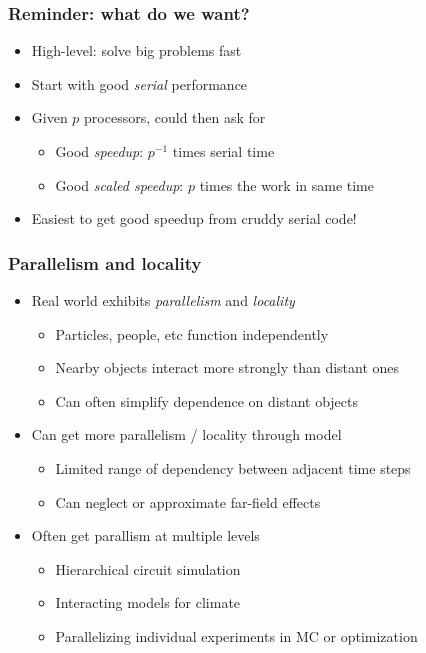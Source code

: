 \documentclass{beamer}
\begin{document}
\begin{frame}
  \frametitle{Reminder: what do we want?}

  \begin{itemize}
  \item High-level: solve big problems fast
  \item Start with good {\em serial} performance
  \item Given $p$ processors, could then ask for
    \begin{itemize}
    \item Good {\em speedup}: $p^{-1}$ times serial time
    \item Good {\em scaled speedup}: $p$ times the work in same time
    \end{itemize}
  \item Easiest to get good speedup from cruddy serial code!
  \end{itemize}
\end{frame}


\begin{frame}
  \frametitle{Parallelism and locality}

  \begin{itemize}
  \item Real world exhibits {\em parallelism} and {\em locality}
    \begin{itemize}
    \item Particles, people, etc function independently
    \item Nearby objects interact more strongly than distant ones
    \item Can often simplify dependence on distant objects
    \end{itemize}
  \item Can get more parallelism / locality through model
    \begin{itemize}
    \item Limited range of dependency between adjacent time steps
    \item Can neglect or approximate far-field effects
    \end{itemize}
  \item Often get parallism at multiple levels
    \begin{itemize}
    \item Hierarchical circuit simulation
    \item Interacting models for climate
    \item Parallelizing individual experiments in MC or optimization
    \end{itemize}
  \end{itemize}
\end{frame}
\end{document}
